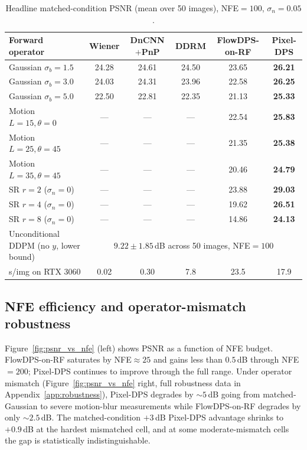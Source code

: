 \documentclass{article}
\begin{document}
\begin{table}[h]
  \centering
  \caption{Headline matched-condition PSNR (mean over 50 images),
    NFE${=}100$, $\sigma_n{=}0.05$.}
  \label{tab:main_nfe100}
  \begin{tabular}{lccccc}
    \toprule
    Forward operator & Wiener & DnCNN$+$PnP & DDRM & FlowDPS-on-RF & Pixel-DPS \\
    \midrule
    Gaussian $\sigma_b{=}1.5$ & 24.28 & 24.61 & 24.50 & 23.65 & \textbf{26.21} \\
    Gaussian $\sigma_b{=}3.0$ & 24.03 & 24.31 & 23.96 & 22.58 & \textbf{26.25} \\
    Gaussian $\sigma_b{=}5.0$ & 22.50 & 22.81 & 22.35 & 21.13 & \textbf{25.33} \\
    \midrule
    Motion $L{=}15, \theta{=}0$  & --- & --- & --- & 22.54 & \textbf{25.83} \\
    Motion $L{=}25, \theta{=}45$ & --- & --- & --- & 21.35 & \textbf{25.38} \\
    Motion $L{=}35, \theta{=}45$ & --- & --- & --- & 20.46 & \textbf{24.79} \\
    \midrule
    SR $r{=}2$ ($\sigma_n{=}0$)   & --- & --- & --- & 23.88 & \textbf{29.03} \\
    SR $r{=}4$ ($\sigma_n{=}0$)   & --- & --- & --- & 19.62 & \textbf{26.51} \\
    SR $r{=}8$ ($\sigma_n{=}0$)   & --- & --- & --- & 14.86 & \textbf{24.13} \\
    \midrule
    Unconditional DDPM (no $y$, lower bound) & \multicolumn{5}{c}{$9.22 \pm 1.85$\,dB across 50 images, NFE${=}100$} \\
    \midrule
    s/img on RTX 3060 & 0.02 & 0.30 & 7.8 & 23.5 & 17.9 \\
    \bottomrule
  \end{tabular}
\end{table}

\subsection{NFE efficiency and operator-mismatch robustness}

Figure~\ref{fig:psnr_vs_nfe} (left) shows PSNR as a function of NFE
budget. FlowDPS-on-RF saturates by NFE${\approx}25$ and gains less
than $0.5$\,dB through NFE${=}200$; Pixel-DPS continues to improve
through the full range. Under operator mismatch (Figure~\ref{fig:psnr_vs_nfe}
right, full robustness data in Appendix~\ref{app:robustness}), Pixel-DPS
degrades by $\sim 5$\,dB going from matched-Gaussian to severe
motion-blur measurements while FlowDPS-on-RF degrades by only
$\sim 2.5$\,dB. The matched-condition $+3$\,dB Pixel-DPS advantage
shrinks to $+0.9$\,dB at the hardest mismatched cell, and at some
moderate-mismatch cells the gap is statistically indistinguishable.
\end{document}
